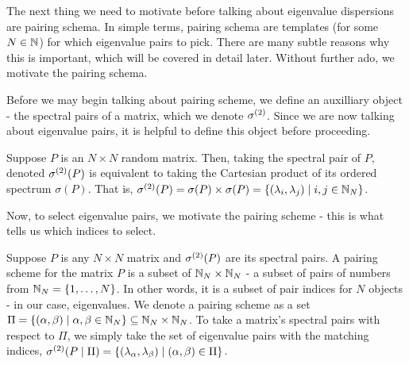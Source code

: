 

The next thing we need to motivate before talking about eigenvalue dispersions are pairing schema. In simple terms, pairing schema are templates (for some $N \in \mathbb{N}$) for which eigenvalue pairs to pick. There are many subtle reasons why this is important, which will be covered in detail later. Without further ado, we motivate the pairing schema. 

Before we may begin talking about pairing scheme, we define an auxilliary object - the spectral pairs of a matrix, which we denote ${\sigma^{(2)}}$. Since we are now talking about eigenvalue pairs, it is helpful to define this object before proceeding.

\begin{definition}
Suppose $P$ is an $N \times N$ random matrix. Then, taking the spectral pair of $P$, denoted ${\sigma^{(2)}}(P)$ is equivalent to taking the Cartesian product of its ordered spectrum $\sigma(P)$. That is, ${\sigma^{(2)}}(P) = \sigma(P) \times \sigma(P) = \{(\lambda_i, \lambda_j) \mid i,j \in \mathbb{N}_N\}$.
\end{definition}

Now, to select eigenvalue pairs, we motivate the pairing scheme - this is what tells us which indices to select.

\begin{definition}
Suppose $P$ is any $N \times N$ matrix and ${\sigma^{(2)}}(P)$ are its spectral pairs. A pairing scheme for the matrix $P$ is a subset of $\mathbb{N}_N \times \mathbb{N}_N$ - a subset of pairs of numbers from $\mathbb{N}_N = \{1, \dots, N\}$. In other words, it is a subset of pair indices for $N$ objects - in our case, eigenvalues. We denote a pairing scheme as a set $\Pi = \{(\alpha, \beta) \mid \alpha, \beta \in \mathbb{N}_N\} \subseteq \mathbb{N}_N \times \mathbb{N}_N$. To take a matrix's spectral pairs with respect to $\Pi$, we simply take the set of eigenvalue pairs with the matching indices, ${\sigma^{(2)}}(P \mid \Pi) = \{(\lambda_{\alpha},\lambda_{\beta}) \mid ({\alpha},{\beta}) \in \Pi\}$.
\end{definition}

